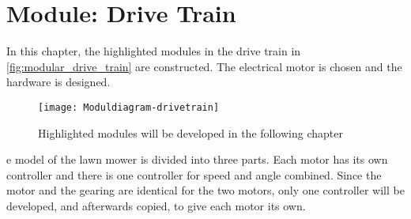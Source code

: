 \graphicspath{{figures/design/drivetrain/}}
\chapter{Module: Drive Train}\label{ch:drivetrain}
In this chapter, the highlighted modules in the drive train in \autoref{fig:modular_drive_train} are constructed. The electrical motor is chosen and the hardware is designed.
\begin{figure}[h]%
\centering%
\texttt{[image: Moduldiagram-drivetrain]}%
\caption{Highlighted modules will be developed in the following chapter}%
\label{fig:modular_drive_train}%
\end{figure}
e model of the lawn mower is divided into three parts. Each motor has its own controller and there is one controller for speed and angle combined. Since the motor and the gearing are identical for the two motors, only one controller will be developed, and afterwards copied, to give each motor its own. 







